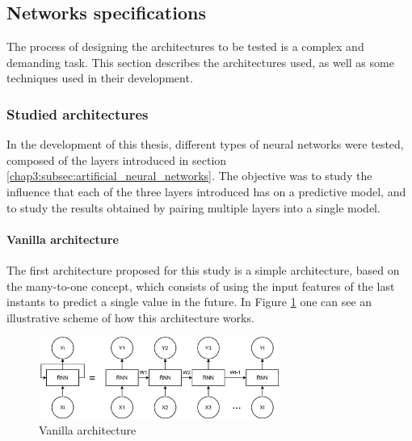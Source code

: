 \subsection{Networks specifications}\label{chap3:subsec:networks_specifications}

The process of designing the architectures to be tested is a complex and demanding task. This section describes the architectures used, as well as some techniques used in their development.

\subsubsection{Studied architectures}\label{chap3:subsubsec:studied_architectures}
In the development of this thesis, different types of neural networks were tested, composed of the layers introduced in section \ref{chap3:subsec:artificial_neural_networks}. The objective was to study the influence that each of the three layers introduced has on a predictive model, and to study the results obtained by pairing multiple layers into a single model. 

\paragraph{Vanilla architecture}

The first architecture proposed for this study is a simple architecture, based on the many-to-one concept, which consists of using the input features of the last instants to predict a single value in the future. 
In Figure \ref{arc1} one can see an illustrative scheme of how this architecture works.

\begin{figure}[h!]
    \centering
    \begin{center}
    \includegraphics[width=0.7\textwidth]{Images/arc1.png}
    \caption{Vanilla architecture}
    \label{arc1}
    \end{center}
\end{figure}

